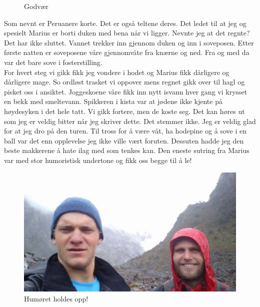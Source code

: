 \begin{figure}[!h]
	\centering
\noindent{}%
	\caption{Godvær}
\label{fig:godvaer}
\end{figure}

Som nevnt er Peruanere korte. Det er også teltene deres. Det
ledet til at jeg og spesielt Marius er borti duken med bena når vi
ligger. Nevnte jeg at det regnte? Det har ikke sluttet. Vannet trekker
inn gjennom duken og inn i
soveposen. Etter første natten er soveposene våre gjennomvåte fra
knærne og ned. Fra og med da var det bare sove i fosterstilling. \\

For
hvert steg vi gikk fikk jeg vondere i hodet og Marius fikk dårligere og
dårligere mage. So ordløst trasket vi oppover mens regnet gikk over
til hagl og pisket oss i ansiktet. Joggeskoene våre fikk inn nytt
isvann hver gang vi krysset en bekk med smeltevann. Spikkeren i kista
var at jødene ikke kjente på høydesyken i det hele tatt. Vi gikk
fortere, men de koste seg. Det kan høres ut som jeg er veldig bitter
når jeg skriver dette. Det stemmer ikke. Jeg er veldig glad for at jeg
dro på den turen. Til tross for å være våt, ha hodepine og å sove i
en ball var det enn opplevelse jeg ikke ville vært foruten. Dessuten
hadde jeg den beste makkerene å hate ilag med som tenkes kan. Den
eneste sutring fra Marius var med stor
humoristisk undertone og fikk oss begge til å le!
\begin{figure}[!h]
	\centering
	\includegraphics[width=\textwidth]{akselogmariusiregn2}
	\caption{Humøret holdes opp!}
\label{fig:turiregnet}
\end{figure}
